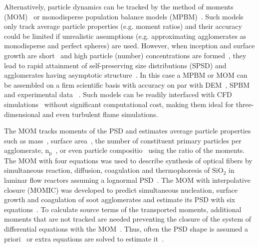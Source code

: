 Alternatively, particle dynamics can be tracked by the method of moments (MOM)~\citep{kazakov1998dynamic} or monodisperse population balance models (MPBM)~\citep{kruis1993simple}. Such models only track average particle properties (e.g. moment ratios) and their accuracy could be limited if unrealistic assumptions (e.g. approximating agglomerates as monodisperse and perfect spheres) are used. However, when inception and surface growth are short~\citep{Spicer2002} and high particle (number) concentrations are formed~\cite{Kelesidis2017}, they lead to rapid attainment of self-preserving size distributions (SPSD) and agglomerates having asymptotic structure~\citep{Goudeli2016}. In this case a MPBM or MOM can be assembled on a firm scientific basis with accuracy on par with DEM~\citep{Kelesidis2017Flame}, SPBM~\citep{kelesidis2019estimating} and experimental data ~\citep{abid2008evolution, ma2013soot, camacho2015mobility}. Such models can be readily interfaced with CFD simulations~\citep{grohn2012fluid} without significant computational cost, making them ideal for three-dimensional and even turbulent flame simulations. 

The MOM tracks moments of the PSD and estimates average particle properties such as mass~\citep{pratsinis1988simultaneous}, surface area~\citep{blanquart2009joint}, the number of constituent primary particles per agglomerate, $\mathrm{n_p}$~\citep{kazakov1998dynamic}, or even particle compositio~\citep{blanquart2009analyzing} using the ratio of the moments. The MOM with four equations was used to describe synthesis of optical fibers by simultaneous reaction, diffusion, coagulation and thermophoresis of $\mathrm{SiO_2}$ in laminar flow reactors assuming a lognormal PSD~\citep{kim1988manufacture}. The MOM with interpolative closure (MOMIC) was developed to predict simultaneous nucleation, surface growth and coagulation of soot agglomerates and estimate its PSD with six equations~\citep{kazakov1998dynamic}. To calculate source terms of the transported moments, additional moments that are not tracked are needed preventing the closure of the system of differential equations with the MOM~\citep{pratsinis1988simultaneous, frenklach1987aerosol}. Thus, often the PSD shape is assumed a priori~\citep{pratsinis1988simultaneous} or extra equations are solved to estimate it~\citep{kruis1993simple}.

